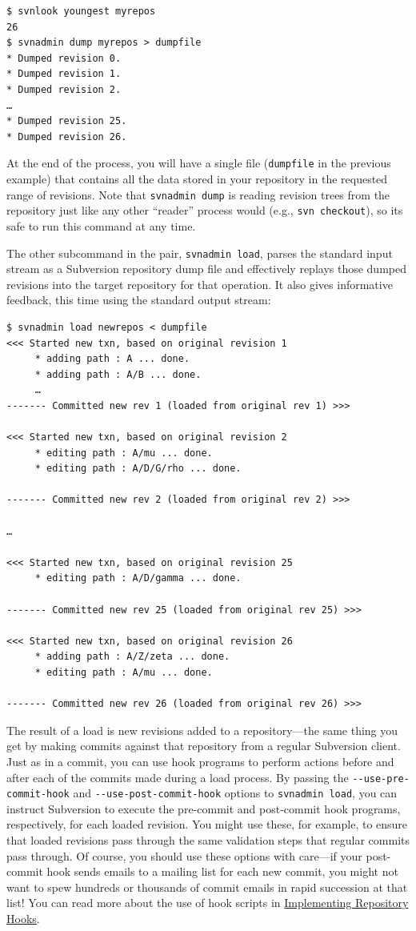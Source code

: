 \begin{verbatim}
$ svnlook youngest myrepos
26
$ svnadmin dump myrepos > dumpfile
* Dumped revision 0.
* Dumped revision 1.
* Dumped revision 2.
…
* Dumped revision 25.
* Dumped revision 26.
\end{verbatim}

At the end of the process, you will have a single file
(\texttt{dumpfile} in the previous example) that contains all the data
stored in your repository in the requested range of revisions. Note that
\texttt{svnadmin\ dump} is reading revision trees from the repository
just like any other ``reader'' process would (e.g.,
\texttt{svn\ checkout}), so it\textquotesingle s safe to run this
command at any time.

The other subcommand in the pair, \texttt{svnadmin\ load}, parses the
standard input stream as a Subversion repository dump file and
effectively replays those dumped revisions into the target repository
for that operation. It also gives informative feedback, this time using
the standard output stream:

\begin{verbatim}
$ svnadmin load newrepos < dumpfile
<<< Started new txn, based on original revision 1
     * adding path : A ... done.
     * adding path : A/B ... done.
     …
------- Committed new rev 1 (loaded from original rev 1) >>>

<<< Started new txn, based on original revision 2
     * editing path : A/mu ... done.
     * editing path : A/D/G/rho ... done.

------- Committed new rev 2 (loaded from original rev 2) >>>

…

<<< Started new txn, based on original revision 25
     * editing path : A/D/gamma ... done.

------- Committed new rev 25 (loaded from original rev 25) >>>

<<< Started new txn, based on original revision 26
     * adding path : A/Z/zeta ... done.
     * editing path : A/mu ... done.

------- Committed new rev 26 (loaded from original rev 26) >>>
\end{verbatim}

The result of a load is new revisions added to a repository---the same
thing you get by making commits against that repository from a regular
Subversion client. Just as in a commit, you can use hook programs to
perform actions before and after each of the commits made during a load
process. By passing the \texttt{-\/-use-pre-commit-hook} and
\texttt{-\/-use-post-commit-hook} options to \texttt{svnadmin\ load},
you can instruct Subversion to execute the pre-commit and post-commit
hook programs, respectively, for each loaded revision. You might use
these, for example, to ensure that loaded revisions pass through the
same validation steps that regular commits pass through. Of course, you
should use these options with care---if your post-commit hook sends
emails to a mailing list for each new commit, you might not want to spew
hundreds or thousands of commit emails in rapid succession at that list!
You can read more about the use of hook scripts in
\hyperref[svn.reposadmin.hooks]{Implementing Repository Hooks}.

